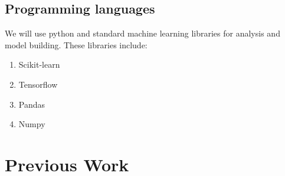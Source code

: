 \documentclass{article}
\begin{document}
\subsection{Programming languages}

We will use python and standard machine learning libraries for analysis and model building. These libraries include:

\begin{enumerate}
    \item Scikit-learn \\
    \item Tensorflow \\
    \item Pandas \\
    \item Numpy
\end{enumerate}{}
\section{Previous Work}
\end{document}
